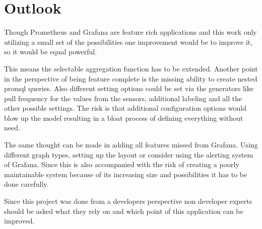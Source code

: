 \section{Outlook}

Though Prometheus and Grafana are feature rich applications and this work only utilizing a small set of the possibilities one improvement would be to improve it, so it would be equal powerful. 

This means the selectable aggregation function has to be extended. Another point in the perspective of being feature complete is the missing ability to create nested \gls{promql} queries. Also different setting options could be set via the generators like pull frequency for the values from the sensors, additional labeling and all the other possible settings. The risk is that additional configuration options would blow up the model resulting in a bloat process of defining everything without need.

The same thought can be made in adding all features missed from Grafana. Using different graph types, setting up the layout or consider using the alerting system of Grafana. Since this is also accompanied with the risk of creating a poorly maintainable system because of its increasing size and possibilities it has to be done carefully.

Since this project was done from a developers perspective non developer experts should be asked what they rely on and which point of this application can be improved.


